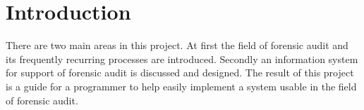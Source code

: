 \chapter*{Introduction} \label{Introduction}



%




There are two main areas in this project. At first the field of forensic audit and its frequently recurring processes are introduced. Secondly an information system for support of forensic audit is discussed and designed. The result of this project is a guide for a programmer to help easily implement a system usable in the field of forensic audit.


